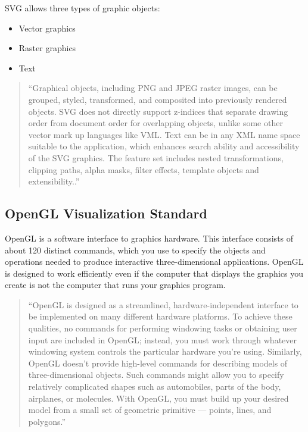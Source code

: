 SVG allows three types of graphic objects:
\begin{itemize}
\item Vector graphics
\item Raster graphics
\item Text
\end{itemize}

\begin{quotation}
``Graphical objects, including PNG and JPEG raster images, can be grouped, styled, transformed,
and composited into previously rendered objects. SVG does not directly support z-indices
that separate drawing order from document order for overlapping objects, unlike some other vector mark up languages like VML.
Text can be in any XML name space suitable to the application, which enhances search ability and accessibility of the SVG graphics.
The feature set includes nested transformations, clipping paths, alpha masks, filter effects, template objects and extensibility..''~\cite{SVG}
\end{quotation}

\subsection{OpenGL Visualization Standard}
\label{sec:opengl}
OpenGL is a software interface to graphics hardware. This interface consists of about 120 distinct commands,
which you use to specify the objects and operations needed to produce interactive three-dimensional applications.
OpenGL is designed to work efficiently even if the computer that displays the graphics you create is not the computer that runs your graphics program.

\begin{quotation}
``OpenGL is designed as a streamlined, hardware-independent interface to be implemented on many different hardware platforms.
To achieve these qualities, no commands for performing windowing tasks or obtaining user input are included in OpenGL;
instead, you must work through whatever windowing system controls the particular hardware you're using.
Similarly, OpenGL doesn't provide high-level commands for describing models of three-dimensional objects.
Such commands might allow you to specify relatively complicated shapes such as automobiles, parts of the body, airplanes,
or molecules. With OpenGL, you must build up your desired model from a small set of geometric primitive --- points,
lines, and polygons.''~\cite{THE_RED_BOOK}
\end{quotation}

